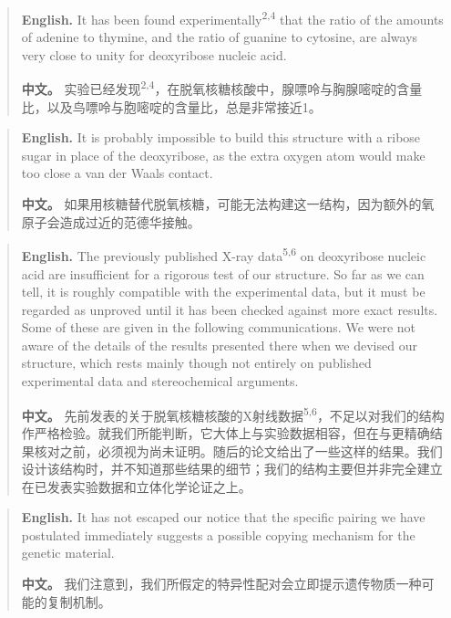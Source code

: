 \begin{quote}
\noindent\textbf{English.} It has been found experimentally\textsuperscript{2,4} that the ratio of the amounts of adenine to thymine, and the ratio of guanine to cytosine, are always very close to unity for deoxyribose nucleic acid.

\smallskip
\noindent\textbf{中文。} 实验已经发现\textsuperscript{2,4}，在脱氧核糖核酸中，腺嘌呤与胸腺嘧啶的含量比，以及鸟嘌呤与胞嘧啶的含量比，总是非常接近1。
\end{quote}

\begin{quote}
\noindent\textbf{English.} It is probably impossible to build this structure with a ribose sugar in place of the deoxyribose, as the extra oxygen atom would make too close a van der Waals contact.

\smallskip
\noindent\textbf{中文。} 如果用核糖替代脱氧核糖，可能无法构建这一结构，因为额外的氧原子会造成过近的范德华接触。
\end{quote}

\begin{quote}
\noindent\textbf{English.} The previously published X-ray data\textsuperscript{5,6} on deoxyribose nucleic acid are insufficient for a rigorous test of our structure. So far as we can tell, it is roughly compatible with the experimental data, but it must be regarded as unproved until it has been checked against more exact results. Some of these are given in the following communications. We were not aware of the details of the results presented there when we devised our structure, which rests mainly though not entirely on published experimental data and stereochemical arguments.

\smallskip
\noindent\textbf{中文。} 先前发表的关于脱氧核糖核酸的X射线数据\textsuperscript{5,6}，不足以对我们的结构作严格检验。就我们所能判断，它大体上与实验数据相容，但在与更精确结果核对之前，必须视为尚未证明。随后的论文给出了一些这样的结果。我们设计该结构时，并不知道那些结果的细节；我们的结构主要但并非完全建立在已发表实验数据和立体化学论证之上。
\end{quote}

\begin{quote}
\noindent\textbf{English.} It has not escaped our notice that the specific pairing we have postulated immediately suggests a possible copying mechanism for the genetic material.

\smallskip
\noindent\textbf{中文。} 我们注意到，我们所假定的特异性配对会立即提示遗传物质一种可能的复制机制。
\end{quote}

